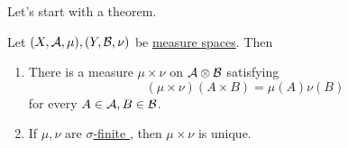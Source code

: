Let's start with a theorem.
\begin{theorem}
	Let \((X, \mathcal{\MakeUppercase{a}} , \mu ), (Y, \mathcal{\MakeUppercase{b}} , \nu )\) be \hyperref[def:measure-space]{measure spaces}. Then
	\begin{enumerate}
		\item There is a measure \(\mu \times \nu \) on \(\mathcal{\MakeUppercase{a}} \otimes \mathcal{\MakeUppercase{b}} \) satisfying
		      \[
			      (\mu \times \nu )(A\times B) = \mu (A)\nu (B)
		      \]
		      for every \(A\in \mathcal{\MakeUppercase{a}} , B\in \mathcal{\MakeUppercase{b}} \).
		\item If \(\mu , \nu \) are \hyperref[def:finite-measure]{\(\sigma\)-finite }, then \(\mu \times \nu \) is unique.
	\end{enumerate}
\end{theorem}
